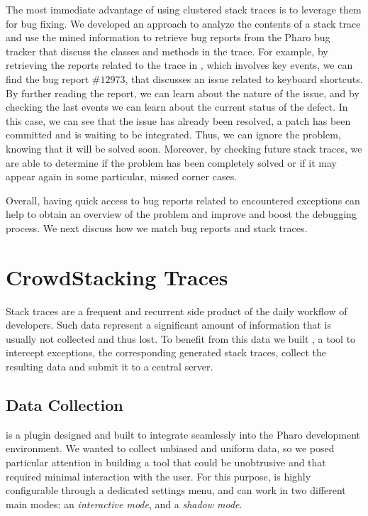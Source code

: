 The most immediate advantage of using clustered stack traces is to leverage them for bug fixing.
We developed an approach to analyze the contents of a stack trace and use the mined information to retrieve bug reports from the Pharo bug tracker that discuss the classes and methods in the trace.
For example, by retrieving the reports related to the trace in , which involves key events, we can find the bug report $\#12973$, that discusses an issue related to keyboard shortcuts.
By further reading the report, we can learn about the nature of the issue, and by checking the last events we can learn about the current status of the defect.
In this case, we can see that the issue has already been resolved, a patch has been committed and is waiting to be integrated.
Thus, we can ignore the problem, knowing that it will be solved soon.
Moreover, by checking future stack traces, we are able to determine if the problem has been completely solved or if it may appear again in some particular, missed corner cases.

Overall, having quick access to bug reports related to encountered exceptions can help to obtain an overview of the problem and improve and boost the debugging process.
We next discuss how we match bug reports and stack traces.


\section{CrowdStacking Traces}\label{sec:stacktraces-dataset}

Stack traces are a frequent and recurrent side product of the daily workflow of developers.
Such data represent a significant amount of information that is usually not collected and thus lost.
To benefit from this data we built \shr, a tool to intercept exceptions, the corresponding generated stack traces, collect the resulting data and submit it to a central server.


\subsection{Data Collection}\label{sec:stacktraces-tool}

\shr is a plugin designed and built to integrate seamlessly into the Pharo development environment.
We wanted to collect unbiased and uniform data, so we posed particular attention in building a tool that could be unobtrusive and that required minimal interaction with the user.
For this purpose, \shr is highly configurable through a dedicated settings menu, and can work in two different main modes: an \emph{interactive mode}, and a \emph{shadow mode}.

